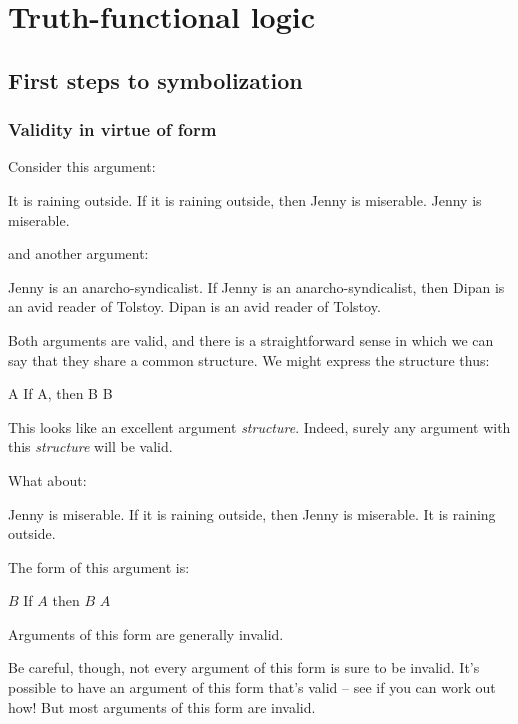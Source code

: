 \part{Truth-functional logic}
\label{ch.TFL}

\chapter{First steps to symbolization}

\section{Validity in virtue of form}\label{s:ValidityInVirtueOfForm}
Consider this argument:
	\begin{earg}
		\prem It is raining outside.
		\prem If it is raining outside, then Jenny is miserable.
		\conc Jenny is miserable.
	\end{earg}
and another argument:
	\begin{earg}
		\prem Jenny is an anarcho-syndicalist.
		\prem If Jenny is an anarcho-syndicalist, then Dipan is an avid reader of Tolstoy.
		\conc Dipan is an avid reader of Tolstoy.
	\end{earg}
Both arguments are valid, and there is a straightforward sense in which we can say that they share a common structure. We might express the structure thus:
	\begin{earg}
		\prem A
		\prem If A, then B
		\conc B
	\end{earg}
This looks like an excellent argument \emph{structure}. Indeed, surely any argument with this \emph{structure} will be valid. 

What about:
	\begin{earg}
		\prem Jenny is miserable.
		\prem If it is raining outside, then Jenny is miserable.
		\conc It is raining outside.
	\end{earg}
The form of this argument is:
\begin{earg}
\prem	$B$
\prem	If $A$ then $B$
\conc $A$
\end{earg}
Arguments of this form are generally invalid. 

Be careful, though, not every argument of this form is sure to be invalid.
It’s possible to have an argument of this form that’s valid – see if you can work out how!
But most arguments of this form are invalid.


